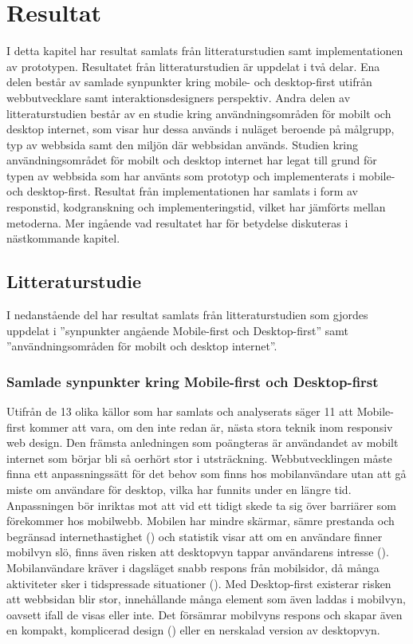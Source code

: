 \documentclass[11pt]{article}
\begin{document}
\newpage

\section{Resultat}

I detta kapitel har resultat samlats från litteraturstudien samt implementationen av prototypen.
Resultatet från litteraturstudien är uppdelat i två delar. Ena delen består av samlade synpunkter kring mobile- och desktop-first utifrån webbutvecklare samt interaktionsdesigners perspektiv. Andra delen av litteraturstudien består av en studie kring användningsområden för mobilt och desktop internet, som visar hur dessa används i nuläget beroende på målgrupp, typ av webbsida samt den miljön där webbsidan används. Studien kring användningsområdet för mobilt och desktop internet har legat till grund för typen av webbsida som har använts som prototyp och implementerats i mobile- och desktop-first. Resultat från implementationen har samlats i form av responstid, kodgranskning och implementeringstid, vilket har jämförts mellan metoderna. Mer ingående vad resultatet har för betydelse diskuteras i nästkommande kapitel.


\subsection{Litteraturstudie}
I nedanstående del har resultat samlats från litteraturstudien som gjordes uppdelat i ''synpunkter angående Mobile-first och Desktop-first'' samt ''användningsområden för mobilt och desktop internet''.
\subsubsection{Samlade synpunkter kring Mobile-first och Desktop-first}
Utifrån de 13 olika källor som har samlats och analyserats säger 11 att Mobile-first kommer att vara, om den inte redan är, nästa stora teknik inom responsiv web design. Den främsta anledningen som poängteras är användandet av mobilt internet som börjar bli så oerhört stor i utsträckning. Webbutvecklingen måste finna ett anpassningssätt för det behov som finns hos mobilanvändare utan att gå miste om användare för desktop, vilka har funnits under en längre tid. Anpassningen bör inriktas mot att vid ett tidigt skede ta sig över barriärer som förekommer hos mobilwebb. Mobilen har mindre skärmar, sämre prestanda och begränsad internethastighet (\cite{themepartner}) och statistik visar att om en användare finner mobilvyn slö, finns även risken att desktopvyn tappar användarens intresse (\cite{zurbword}). Mobilanvändare kräver i dagsläget snabb respons från mobilsidor, då många aktiviteter sker i tidspressade situationer (\cite{techradar}). Med Desktop-first existerar risken att webbsidan blir stor, innehållande många element som även laddas i mobilvyn, oavsett ifall de visas eller inte. Det försämrar mobilvyns respons och skapar även en kompakt, komplicerad design (\cite{zurbword}) eller en nerskalad version av desktopvyn.
\end{document}
